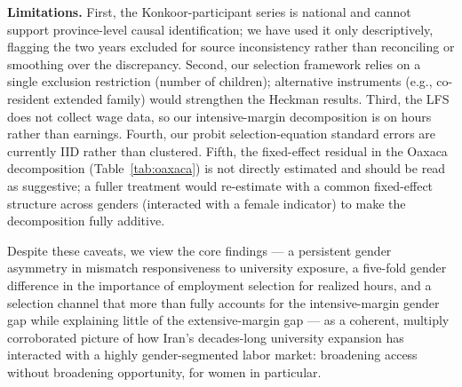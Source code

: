 \documentclass[11pt]{article}
\begin{document}
\textbf{Limitations.} First, the Konkoor-participant series is national and cannot support province-level causal identification; we have used it only descriptively, flagging the two years excluded for source inconsistency rather than reconciling or smoothing over the discrepancy. Second, our selection framework relies on a single exclusion restriction (number of children); alternative instruments (e.g., co-resident extended family) would strengthen the Heckman results. Third, the LFS does not collect wage data, so our intensive-margin decomposition is on hours rather than earnings. Fourth, our probit selection-equation standard errors are currently IID rather than clustered. Fifth, the fixed-effect residual in the Oaxaca decomposition (Table~\ref{tab:oaxaca}) is not directly estimated and should be read as suggestive; a fuller treatment would re-estimate with a common fixed-effect structure across genders (interacted with a female indicator) to make the decomposition fully additive.

Despite these caveats, we view the core findings --- a persistent gender asymmetry in mismatch responsiveness to university exposure, a five-fold gender difference in the importance of employment selection for realized hours, and a selection channel that more than fully accounts for the intensive-margin gender gap while explaining little of the extensive-margin gap --- as a coherent, multiply corroborated picture of how Iran's decades-long university expansion has interacted with a highly gender-segmented labor market: broadening access without broadening opportunity, for women in particular.
\end{document}

